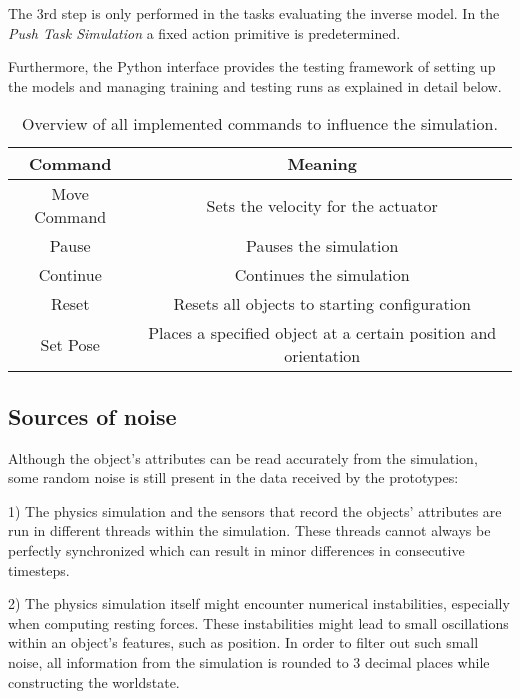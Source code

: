 The 3rd step is only performed in the tasks evaluating the inverse model. In the \textit{Push Task Simulation} a fixed action primitive is predetermined.

Furthermore, the Python interface provides the testing framework of setting up the models and managing training and testing runs as explained in detail below.

\begin{table}
	\centering
	\begin{tabular}{|c|c|}
		\hline \textbf{Command} & \textbf{Meaning} \\ 
		\hline Move Command & Sets the velocity for the actuator \\ 
		\hline Pause & Pauses the simulation \\
		\hline Continue & Continues the simulation \\
		\hline Reset & Resets all objects to starting configuration \\
		\hline Set Pose & Places a specified object at a certain position and orientation \\
		\hline
	\end{tabular} 
	\caption{Overview of all implemented commands to influence the simulation.}
	\label{tab:commands}
\end{table}

\subsection{Sources of noise \label{sec:noise}}

Although the object's attributes can be read accurately from the simulation, some random noise is still present in the data received by the prototypes: 

1) The physics simulation and the sensors that record the objects' attributes are run in different threads within the simulation. These threads cannot always be perfectly synchronized which can result in minor differences in consecutive timesteps. 

2) The physics simulation itself might encounter numerical instabilities, especially when computing resting forces. These instabilities
might lead to small oscillations within an object's features, such as position. In order to filter out such small noise, all
information from the simulation is rounded to 3 decimal places while constructing the worldstate. 

